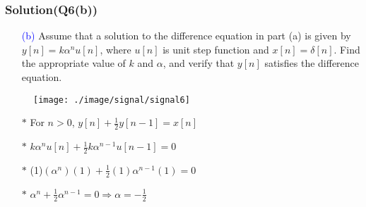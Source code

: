 \documentclass{beamer}
\newcommand{\blue}[1]{\textcolor{blue}{#1}}
\begin{document}
\begin{frame}
\frametitle{Solution(Q6(b))}

\begin{itemize} \itemsep1pt \parskip0pt 
  \item[\blue{(b)}] Assume that a solution to the difference equation in part (a) is given by $y[n] = k\alpha^nu[n]$, where $u[n]$ is unit step function and $x[n] = \delta[n]$. Find the appropriate value of $k$ and $\alpha$, and verify that $y[n]$ satisfies the difference equation.
\end{itemize}


\begin{figure}[H]
  \centering
  \texttt{[image: ./image/signal/signal6]}
\end{figure}

\begin{itemize} \itemsep1pt \parskip0pt 
  \item[$\ast$] For $n > 0$, $y[n] + \frac{1}{2}y[n-1] = x[n]$
  \item[$\ast$] $k\alpha^nu[n]+\frac{1}{2}k\alpha^{n-1}u[n-1]=0$
  \item[$\ast$] (1)$(\alpha^n)(1) + \frac{1}{2}(1)\alpha^{n-1}(1) = 0$
  \item[$\ast$] $\alpha^n + \frac{1}{2}\alpha^{n-1} = 0 \Rightarrow \alpha = -\frac{1}{2}$
\end{itemize}

\end{frame}
\end{document}
